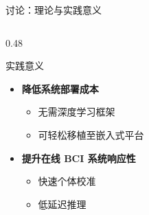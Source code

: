\begin{frame}{讨论：理论与实践意义}
\begin{columns}[T]
\begin{column}{0.48\textwidth}
\begin{block}{\normalsize {实践意义}}
\begin{itemize}
                    \vspace{0.5em}
                    \item \textbf{降低系统部署成本}
                    \begin{itemize}
                        \item 无需深度学习框架
                        \item 可轻松移植至嵌入式平台
                    \end{itemize}

                    \vspace{0.5em}
                    \item \textbf{提升在线 BCI 系统响应性}
                    \begin{itemize}
                        \item 快速个体校准
                        \item 低延迟推理
                    \end{itemize}
                \end{itemize}
            \end{block}
        \end{column}
    \end{columns}
\end{frame}

